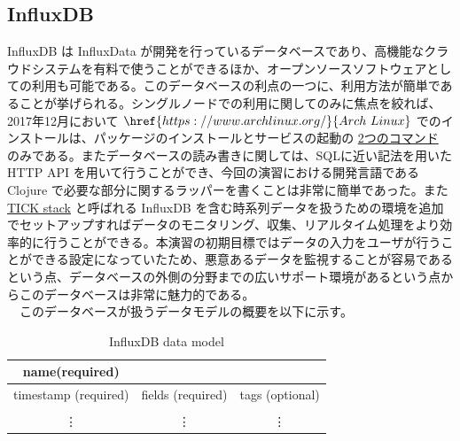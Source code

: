 \documentclass{scrartcl}
\begin{document}
\subsection{InfluxDB}
\label{sec:org07655e7}
InfluxDB は InfluxData が開発を行っているデータベースであり、高機能なクラウドシステムを有料で使うことができるほか、オープンソースソフトウェアとしての利用も可能である。このデータベースの利点の一つに、利用方法が簡単であることが挙げられる。シングルノードでの利用に関してのみに焦点を絞れば、2017年12月において \(\href{https://www.archlinux.org/}{Arch\ Linux}\) でのインストールは、パッケージのインストールとサービスの起動の \href{https://wiki.archlinux.jp/index.php/InfluxDB}{2つのコマンド} のみである。またデータベースの読み書きに関しては、SQLに近い記法を用いた HTTP API を用いて行うことができ、今回の演習における開発言語である Clojure で必要な部分に関するラッパーを書くことは非常に簡単であった。また \href{https://www.influxdata.com/time-series-platform/}{TICK stack} と呼ばれる InfluxDB を含む時系列データを扱うための環境を追加でセットアップすればデータのモニタリング、収集、リアルタイム処理をより効率的に行うことができる。本演習の初期目標ではデータの入力をユーザが行うことができる設定になっていたため、悪意あるデータを監視することが容易であるという点、データベースの外側の分野までの広いサポート環境があるという点からこのデータベースは非常に魅力的である。\\
　このデータベースが扱うデータモデルの概要を以下に示す。\\
\begin{table}[htbp]
\caption{InfluxDB data model}
\centering
\begin{tabular}{|c|c|c|}
\hline
name(required) &  & \\
\hline
\hline
timestamp (required) & fields (required) & tags (optional)\\
\hline
 &  & \\
\vdots & \vdots & \vdots\\
\hline
\end{tabular}
\end{table}
\end{document}
